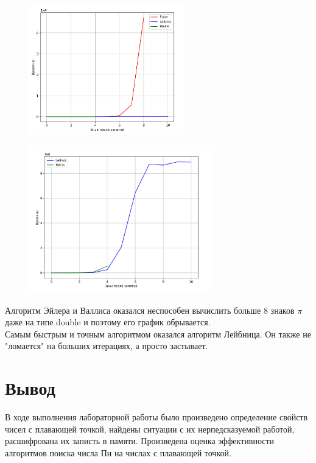 \documentclass[a4paper,12pt]{article} %
\begin{document}
\begin{figure}[H]
    \centering
    \includegraphics[width=0.6\textwidth]{10.jpg}
\end{figure} 
\begin{figure}[H]
    \centering
    \includegraphics[width=0.7\textwidth]{11.jpg}
\end{figure} 

Алгоритм Эйлера и Валлиса оказался неспособен вычислить больше 8 знаков $\pi$ даже на типе double и поэтому его график обрывается.\\
 Самым быстрым  и точным алгоритмом оказался алгоритм Лейбница. Он также не "ломается" на больших итерациях, а просто застывает. 

\section{Вывод}
В ходе выполнения лабораторной работы было произведено определение свойств чисел с плавающей точкой, найдены ситуации с их нерпедсказуемой работой, расшифрована их записть в памяти. Произведена оценка эффективности алгоритмов поиска числа Пи на числах с плавающей точкой.
\end{document}
